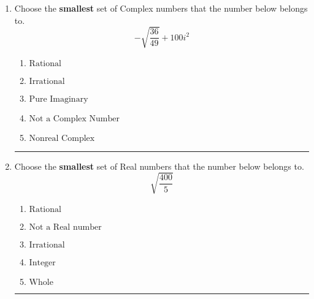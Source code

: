 \documentclass[14pt]{extbook}
\newcommand{\litem}[1]{\item#1\hspace*{-1cm}\rule{\textwidth}{0.4pt}}
\begin{document}
\begin{enumerate}
{\begin{enumerate}[label=\Alph*.]
\end{enumerate} }
\litem{
Choose the \textbf{smallest} set of Complex numbers that the number below belongs to.\[ -\sqrt{\frac{36}{49}} + 100i^2 \]\begin{enumerate}[label=\Alph*.]
\item \( \text{Rational} \)
\item \( \text{Irrational} \)
\item \( \text{Pure Imaginary} \)
\item \( \text{Not a Complex Number} \)
\item \( \text{Nonreal Complex} \)

\end{enumerate} }
\litem{
Choose the \textbf{smallest} set of Real numbers that the number below belongs to.\[ \sqrt{\frac{400}{5}} \]\begin{enumerate}[label=\Alph*.]
\item \( \text{Rational} \)
\item \( \text{Not a Real number} \)
\item \( \text{Irrational} \)
\item \( \text{Integer} \)
\item \( \text{Whole} \)

\end{enumerate} }
\end{enumerate}
\end{document}
